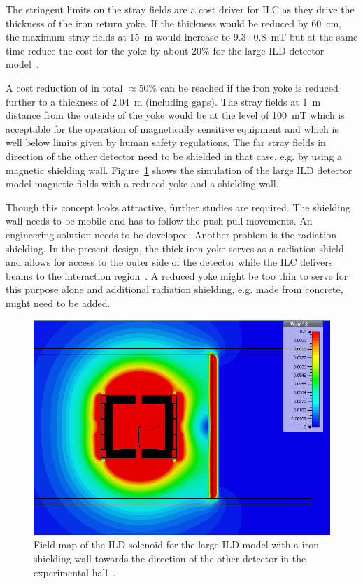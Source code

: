 The stringent limits on the stray fields are a cost driver for ILC as they drive the thickness of the iron return yoke. If the thickness would be reduced by 60~cm, the maximum stray fields at 15~m would increase to 9.3$\pm$0.8~mT but at the same time reduce the cost for the yoke by about 20\% for the large ILD detector model~\cite{ild:bib:Magnet_Simulations}.

A cost reduction of in total $\approx$50\% can be reached if the iron yoke is reduced further to a thickness of 2.04~m (including gaps). The stray fields at 1~m distance from the outside of the yoke would be at the level of 100~mT which is acceptable for the operation of magnetically sensitive equipment and which is well below limits given by human safety regulations. The far stray fields in direction of the other detector need to be shielded in that case, e.g. by using a magnetic shielding wall. Figure~\ref{ILD:fig:magnet_wall} shows the simulation of the large ILD detector model magnetic fields with a reduced yoke and a shielding wall.

Though this concept looks attractive, further studies are required. The shielding wall needs to be mobile and has to follow the push-pull movements. An engineering solution needs to be developed. Another problem is the radiation shielding. In the present design, the thick iron yoke serves as a radiation shield and allows for access to the outer side of the detector while the ILC delivers beams to the interaction region~\cite{ild:bib:Radiation_Hall}. A reduced yoke might be too thin to serve for this purpose alone and additional radiation shielding, e.g. made from concrete, might need to be added. 
\begin{figure}[htb]
    \centering
    \includegraphics[width=0.8\hsize]{Integration/fig/magnet_wall.png}
    \caption{Field map of the ILD solenoid for the large ILD model with a iron shielding wall towards the direction of the other detector in the experimental hall~\cite{ild:bib:Magnet_Simulations}.}
    \label{ILD:fig:magnet_wall}
\end{figure}


